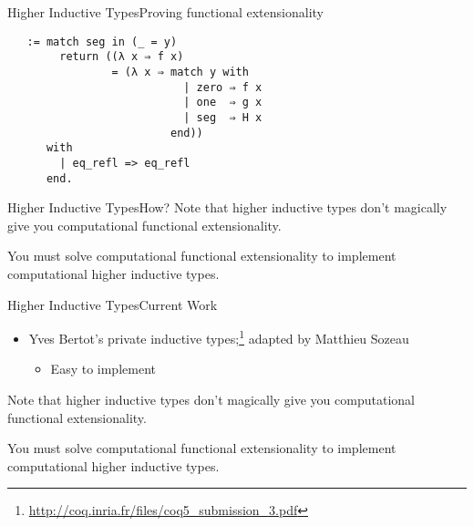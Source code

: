 \documentclass{beamer}
\begin{document}
\begin{frame}[fragile]{Higher Inductive Types}{Proving functional extensionality}
  \Large
\begin{verbatim}
   := match seg in (_ = y)
        return ((λ x ⇒ f x)
                = (λ x ⇒ match y with
                           | zero ⇒ f x
                           | one  ⇒ g x
                           | seg  ⇒ H x
                         end))
      with
        | eq_refl => eq_refl
      end.
\end{verbatim}
\end{frame}

\begin{frame}[fragile]{Higher Inductive Types}{How?}
  \Large
  Note that higher inductive types don't magically give you computational functional extensionality. \pause
  
  You must solve computational functional extensionality to implement computational higher inductive types.
\end{frame}

\begin{frame}[fragile]{Higher Inductive Types}{Current Work}
  \Large
  \begin{itemize}
    \item Yves Bertot's private inductive types;\footnote{\url{http://coq.inria.fr/files/coq5\_submission_3.pdf}} adapted by Matthieu Sozeau
      \begin{itemize}
        \item Easy to implement
      \end{itemize}
  \end{itemize}Note that higher inductive types don't magically give you computational functional extensionality. \pause
  
  You must solve computational functional extensionality to implement computational higher inductive types.
\end{frame}
\end{document}
